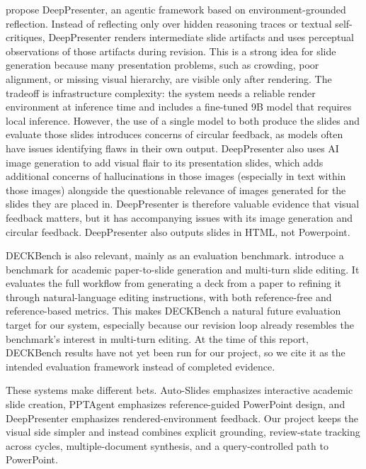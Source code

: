 \documentclass[11pt]{article}
\begin{document}
\citet{zheng2026deeppresenter} propose DeepPresenter, an agentic framework based on environment-grounded reflection. Instead of reflecting only over hidden reasoning traces or textual self-critiques, DeepPresenter renders intermediate slide artifacts and uses perceptual observations of those artifacts during revision. This is a strong idea for slide generation because many presentation problems, such as crowding, poor alignment, or missing visual hierarchy, are visible only after rendering. The tradeoff is infrastructure complexity: the system needs a reliable render environment at inference time and includes a fine-tuned 9B model that requires local inference. However, the use of a single model to both produce the slides and evaluate those slides introduces concerns of circular feedback, as models often have issues identifying flaws in their own output.  DeepPresenter also uses AI image generation to add visual flair to its presentation slides, which adds additional concerns of hallucinations in those images (especially in text within those images) alongside the questionable relevance of images generated for the slides they are placed in.  DeepPresenter is therefore valuable evidence that visual feedback matters, but it has accompanying issues with its image generation and circular feedback.  DeepPresenter also outputs slides in HTML, not Powerpoint.

DECKBench is also relevant, mainly as an evaluation benchmark. \citet{jang2026deckbench} introduce a benchmark for academic paper-to-slide generation and multi-turn slide editing. It evaluates the full workflow from generating a deck from a paper to refining it through natural-language editing instructions, with both reference-free and reference-based metrics. This makes DECKBench a natural future evaluation target for our system, especially because our revision loop already resembles the benchmark's interest in multi-turn editing. At the time of this report, DECKBench results have not yet been run for our project, so we cite it as the intended evaluation framework instead of completed evidence.

These systems make different bets. Auto-Slides emphasizes interactive academic slide creation, PPTAgent emphasizes reference-guided PowerPoint design, and DeepPresenter emphasizes rendered-environment feedback. Our project keeps the visual side simpler and instead combines explicit grounding, review-state tracking across cycles, multiple-document synthesis, and a query-controlled path to PowerPoint.
\end{document}
